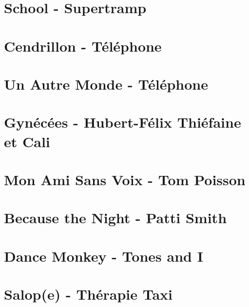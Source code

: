 \documentclass[11pt]{article}
\begin{document}
\section{School - Supertramp}



\section{Cendrillon - Téléphone}
\begin{guitar}

\end{guitar}

\section*{Un Autre Monde - Téléphone}

\section{Gynécées - Hubert-Félix Thiéfaine et Cali}
\begin{guitar}

\end{guitar}


\section{Mon Ami Sans Voix - Tom Poisson}
\begin{guitar}

\end{guitar}

\section{Because the Night - Patti Smith}


\section{Dance Monkey - Tones and I}
\begin{guitar}

\end{guitar}

\section{Salop(e) - Thérapie Taxi}
\begin{guitar}

\end{guitar}
\end{document}
